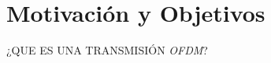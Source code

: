 \section{Motivación y Objetivos}

\begin{frame}
  \begin{center}
	\Huge ¿QUE ES UNA TRANSMISIÓN \textit{OFDM}?
  \end{center}
\end{frame}

\begin{frame}
  

\end{frame}
